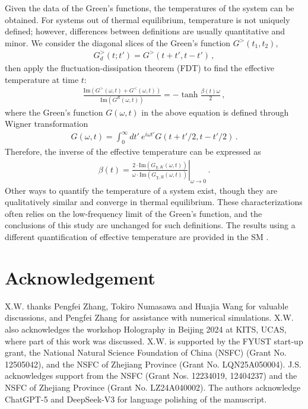 \documentclass[prl,superscriptaddress,notitlepage,showpacs,twocolumn]{revtex4-2}
\newcommand{\om}{{\omega}}
\begin{document}
Given the data of the Green's functions, the temperatures of the system can be obtained. For systems out of thermal equilibrium, temperature is not uniquely defined; however, differences between definitions are usually quantitative and minor. We consider the diagonal slices of the Green's function $G^>(t_1,t_2)$,
\begin{align}
    G_d^>(t;t')=G^>(t+t',t-t')\,,
\end{align}
then apply the fluctuation-dissipation theorem (FDT) \cite{kamenev2023field,kubo1966fluctuation,zhang2021quantum} to find the effective temperature at time $t$:
\begin{align}
    \frac{\mathrm{Im}(G^>(\om,t)+G^<(\om,t))}{\mathrm{Im}(G^R(\om,t))}=-\tanh{\frac{\beta(t) \om}{2}}\,,
\end{align}
where the Green's function $G(\omega,t)$ in the above equation is defined through Wigner transformation 
\begin{gather}
    G(\omega,t)=\int_0^\infty dt' \ e^{i \omega t'} G(t+t'/2,t-t'/2)\,.
    \label{eq:wigner}
\end{gather}
Therefore, the inverse of the effective temperature can be expressed as \cite{eberlein2017quantum}
\begin{gather}
    \beta(t)=\left.\frac{2 \cdot \mathrm{Im}(G_{\chi,K}(\omega,t))}{\omega \cdot \mathrm{Im}(G_{\chi,R}(\omega,t))}\right|_{\omega\rightarrow 0}\,.
    \label{eq:effectivetemp}
\end{gather}
Other ways to quantify the temperature of a system exist, though they are qualitatively similar and converge in thermal equilibrium. These characterizations often relies on the low-frequency limit of the Green's function, and the conclusions of this study are unchanged for such definitions. The results using a different quantification of effective temperature are provided in the SM \cite{suppl}. 



\section{Acknowledgement}
X.W. thanks Pengfei Zhang, Tokiro Numasawa and Huajia Wang for valuable discussions, and Pengfei Zhang for assistance with numerical simulations. X.W. also acknowledges the workshop Holography in Beijing 2024 at KITS, UCAS, where part of this work was discussed. X.W. is supported by the FYUST start-up grant, the National Natural Science Foundation of China (NSFC) (Grant No. 12505042), and the NSFC of Zhejiang Province (Grant No. LQN25A050004). J.S. acknowledges support from the NSFC (Grant Nos. 12234019, 12404237) and the NSFC of Zhejiang Province (Grant No. LZ24A040002). The authors acknowledge ChatGPT-5 and DeepSeek-V3 for language polishing of the manuscript. 
\end{document}
